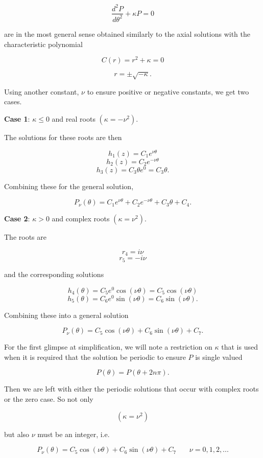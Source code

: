 \documentclass[12pt]{article}
\begin{document}
$$ \frac{d^2P}{d \theta^2} + \kappa P  = 0$$

are in the most general sense obtained similarly  to the axial solutions with the characteristic polynomial

$$C(r) = r^2 + \kappa = 0$$

$$r = \pm \sqrt{- \kappa}.$$

Using another constant, $\nu$ to ensure positive or negative constants, we get two cases.

{\bf Case 1}: $\kappa \le 0$ and real roots $(\kappa = -\nu^2)$.

The solutions for these roots are then

$$ h_1(z) = C_1e^{\nu \theta} $$
$$ h_2(z) = C_2e^{-\nu \theta} $$
$$ h_3(z) = C_3\theta e^0  = C_3\theta.$$

Combining these for the general solution,

\begin{equation}
P_{\nu}(\theta) =  C_1e^{\nu \theta} + C_2e^{-\nu \theta} + C_3\theta + C_4.
\end{equation}

{\bf Case 2}: $\kappa > 0$ and complex roots $(\kappa = \nu^2)$.

The roots are

$$ r_4 = i \nu $$
$$ r_5 = -i \nu $$

and the corresponding solutions

$$ h_4(\theta) = C_5e^0 \cos (\nu \theta) =  C_5\cos (\nu \theta) $$
$$ h_5(\theta) = C_6e^0 \sin (\nu \theta)=  C_6\sin (\nu \theta) .$$

Combining these into a general solution

$$P_{\nu}(\theta) =  C_5\cos (\nu \theta) + C_6\sin (\nu \theta) + C_7.$$

For the first glimpse at simplification, we will note a restriction on $\kappa$
that is used when it is required that the solution be periodic to ensure $P$ is single valued

$$P(\theta) = P(\theta + 2 n \pi).$$

Then we are left with either the periodic solutions that occur with complex roots or the zero case.  So not only

$$(\kappa = \nu^2)$$

but also $\nu$ must be an integer, i.e.

\begin{equation}
P_{\nu}(\theta) =  C_5 \cos (\nu \theta) + C_6 \sin (\nu \theta) + C_7 \,\,\,\,\,\,\,\,\,\,\, \nu = 0, 1, 2, ...
\end{equation}
\end{document}
